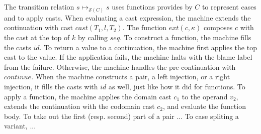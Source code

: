 \documentclass[acmsmall,review,anonymous]{acmart}\settopmatter{printfolios=true,printccs=false,printacmref=false}
\newcommand{\judgeSreduce}[3]{#2 \longmapsto_{\mathcal{S}(#1)} #3}
\begin{document}

The transition relation $\judgeSreduce{C}{s}{s}$ uses functions provides by $C$ 
to represent cases and to apply casts.
%
When evaluating a cast expression, the machine extends the continuation with 
cast $cast(T_1,l,T_2)$. The function $ext(c,\kappa)$ composes $c$ with the cast 
at the top of $k$ by calling $seq$.
%
To construct a function, the machine fills the casts $id$.
%
To return a value to a continuation, the machine first applies the top cast to 
the value. If the application fails, the machine halts with the blame label 
from the failure. Otherwise, the machine handles the pre-continuation with 
$continue$.
%
When the machine constructs a pair, a left injection, or a right injection, it 
fills the casts with $id$ as well, just like how it did for functions. 
%
To apply a function, the machine applies the domain cast $c_1$ to the 
operand $v_2$, extends the continuation with the codomain cast $c_2$, and 
evaluate the function body.
%
To take out the first (resp. second) part of a pair ...
%
To case spliting a variant, ...
\end{document}

